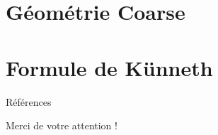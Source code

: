 \documentclass{beamer}
\begin{document}
\section{Géométrie Coarse}
\begin{frame}
  \tableofcontents[currentsection]
\end{frame}


\section{Formule de Künneth}
\begin{frame}
  \tableofcontents[currentsection]
\end{frame}


\begin{frame}{Références}


\end{frame} 

\begin{frame}{}
Merci de votre attention !
\end{frame}
\end{document}
